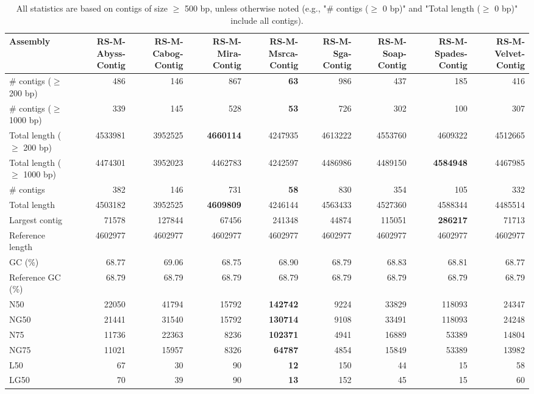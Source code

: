 \documentclass[12pt,a4paper]{article}
\begin{document}
\begin{table}[ht]
\begin{center}
\caption{All statistics are based on contigs of size $\geq$ 500 bp, unless otherwise noted (e.g., "\# contigs ($\geq$ 0 bp)" and "Total length ($\geq$ 0 bp)" include all contigs).}
\begin{tabular}{|l*{8}{|r}|}
\hline
Assembly & RS-M-Abyss-Contig & RS-M-Cabog-Contig & RS-M-Mira-Contig & RS-M-Msrca-Contig & RS-M-Sga-Contig & RS-M-Soap-Contig & RS-M-Spades-Contig & RS-M-Velvet-Contig \\ \hline
\# contigs ($\geq$ 200 bp) & 486 & 146 & 867 & {\bf 63} & 986 & 437 & 185 & 416 \\ \hline
\# contigs ($\geq$ 1000 bp) & 339 & 145 & 528 & {\bf 53} & 726 & 302 & 100 & 307 \\ \hline
Total length ($\geq$ 200 bp) & 4533981 & 3952525 & {\bf 4660114} & 4247935 & 4613222 & 4553760 & 4609322 & 4512665 \\ \hline
Total length ($\geq$ 1000 bp) & 4474301 & 3952023 & 4462783 & 4242597 & 4486986 & 4489150 & {\bf 4584948} & 4467985 \\ \hline
\# contigs & 382 & 146 & 731 & {\bf 58} & 830 & 354 & 105 & 332 \\ \hline
Total length & 4503182 & 3952525 & {\bf 4609809} & 4246144 & 4563433 & 4527360 & 4588344 & 4485514 \\ \hline
Largest contig & 71578 & 127844 & 67456 & 241348 & 44874 & 115051 & {\bf 286217} & 71713 \\ \hline
Reference length & 4602977 & 4602977 & 4602977 & 4602977 & 4602977 & 4602977 & 4602977 & 4602977 \\ \hline
GC (\%) & 68.77 & 69.06 & 68.75 & 68.90 & 68.79 & 68.83 & 68.81 & 68.77 \\ \hline
Reference GC (\%) & 68.79 & 68.79 & 68.79 & 68.79 & 68.79 & 68.79 & 68.79 & 68.79 \\ \hline
N50 & 22050 & 41794 & 15792 & {\bf 142742} & 9224 & 33829 & 118093 & 24347 \\ \hline
NG50 & 21441 & 31540 & 15792 & {\bf 130714} & 9108 & 33491 & 118093 & 24248 \\ \hline
N75 & 11736 & 22363 & 8236 & {\bf 102371} & 4941 & 16889 & 53389 & 14804 \\ \hline
NG75 & 11021 & 15957 & 8326 & {\bf 64787} & 4854 & 15849 & 53389 & 13982 \\ \hline
L50 & 67 & 30 & 90 & {\bf 12} & 150 & 44 & 15 & 58 \\ \hline
LG50 & 70 & 39 & 90 & {\bf 13} & 152 & 45 & 15 & 60 \\ \hline

\end{tabular}
\end{center}
\end{table}
\end{document}
